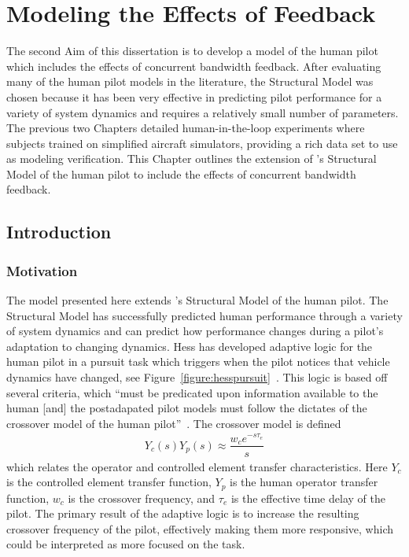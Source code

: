 \chapter{Modeling the Effects of Feedback}
\label{chapter:modeling}

The second Aim of this dissertation is to develop a model of the human pilot which includes the effects of concurrent bandwidth feedback.
After evaluating many of the human pilot models in the literature, the Structural Model was chosen because it has been very effective in predicting pilot performance for a variety of system dynamics and requires a relatively small number of parameters.
The previous two Chapters detailed human-in-the-loop experiments where subjects trained on simplified aircraft simulators, providing a rich data set to use as modeling verification.
This Chapter outlines the extension of \citeauthor{hess_unified_1997}'s Structural Model of the human pilot to include the effects of concurrent bandwidth feedback.

\section{Introduction}
\subsection{Motivation}
The model presented here extends \citeauthor{hess_unified_1997}'s \citeyear{hess_unified_1997} Structural Model of the human pilot.
The Structural Model has successfully predicted human performance through a variety of system dynamics and can predict how performance changes during a pilot's adaptation to changing dynamics.
Hess has developed adaptive logic for the human pilot in a pursuit task which triggers when the pilot notices that vehicle dynamics have changed, see Figure~\ref{figure:hesspursuit}~\citep{hess_modeling_2009}.
This logic is based off several criteria, which ``must be predicated upon information available to the human [and] the postadapated pilot models must follow the dictates of the crossover model of the human pilot''~\citep{hess_modeling_2009}.
The crossover model is defined
\begin{align}
    Y_c(s) Y_p(s) \approx \dfrac{w_c e^{-s \tau_e}}{s}
\end{align}
which relates the operator and controlled element transfer characteristics.
Here $Y_c$ is the controlled element transfer function, $Y_p$ is the human operator transfer function, $w_c$ is the crossover frequency, and $\tau_e$ is the effective time delay of the pilot.
The primary result of the adaptive logic is to increase the resulting crossover frequency of the pilot, effectively making them more responsive, which could be interpreted as more focused on the task.

